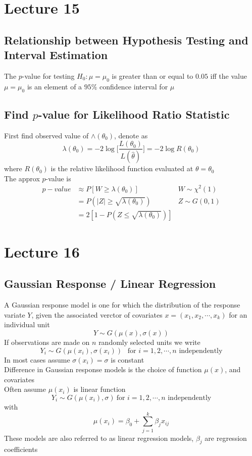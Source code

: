 \documentclass[11pt]{article}
\begin{document}
\section{Lecture 15}
\subsection{Relationship between Hypothesis Testing and Interval Estimation}
The $p$-value for testing $H_0:\mu=\mu_0$ is greater than or equal to $0.05$ iff the value $\mu=\mu_0$ is an element of a $95\%$ confidence interval for $\mu$
\subsection{Find $p$-value for Likelihood Ratio Statistic}
First find observed value of $\wedge(\theta_0)$, denote as 
\[\lambda(\theta_0) = -2\log\Big[\frac{L(\theta_0)}{L(\hat{\theta})}\Big] = -2\log R(\theta_0)\]
where $R(\theta_0)$ is the relative likelihood function evaluated at $\theta=\theta_0$ \\
The approx $p$-value is 
\begin{align*}
  p-value &\approx P[W\geq\lambda(\theta_0)] &W\sim\chi^2(1) \\
          &= P(|Z|\geq\sqrt{\lambda(\theta_0)}) &Z\sim G(0,1) \\
          &= 2[1-P(Z\leq \sqrt{\lambda(\theta_0)})]
\end{align*}

\section{Lecture 16}
\subsection{Gaussian Response / Linear Regression}
A Gaussian response model is one for which the distribution of the response variate $Y$, given the associated verctor of covariates $x=(x_1,x_2,\cdots,x_k)$ for an individual unit 
\[Y\sim G(\mu(x), \sigma(x))\]
If observations are made on $n$ randomly selected units we write 
\[Y_i\sim G(\mu(x_i), \sigma(x_i))\ \ \text{ for $i=1,2,\cdots,n$ independently}\]
In most cases assume $\sigma(x_i)=\sigma$ is constant \\
Difference in Gaussian response models is the choice of function $\mu(x)$, and covariates \\
Often assume $\mu(x_i)$ is linear function 
\[Y_i\sim G(\mu(x_i), \sigma)\ \text{for $i=1,2,\cdots,n$ independently}\]
with \[\mu(x_i) = \beta_0+\sum_{j=1}^{k}\beta_jx_{ij}\]
These models are also referred to as linear regression models, $\beta_j$ are regression coefficients
\end{document}
